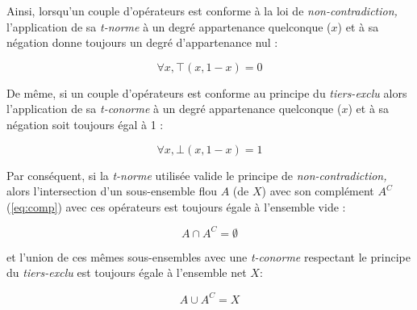 Ainsi, lorsqu'un couple d'opérateurs est conforme à la loi de
\emph{non-contradiction,} l’application de sa \emph{t-norme} à un
degré appartenance quelconque (\(x\)) et à sa négation donne toujours un
degré d'appartenance nul : 

\begin{equation}
  \forall x, ⊤(x,1-x) = 0
\end{equation}

De même, si un couple d'opérateurs est conforme au principe du
\emph{tiers-exclu} alors l’application de sa \emph{t-conorme} à un
degré appartenance quelconque (\(x\))  et à sa négation soit
toujours égal à 1 :

\begin{equation}
  \forall x, ⊥(x,1-x) = 1
\end{equation}

Par conséquent, si la \emph{t-norme} utilisée valide le principe de
\emph{non-contradiction,} alors l'intersection d'un sous-ensemble flou
\(A\) (de \(X\)) avec son complément \(A^C\) (\autoref{eq:comp}) avec
ces opérateurs est toujours égale à l'ensemble vide :

\begin{equation}
  A \cap A^C = \emptyset
\end{equation}

et l'union de ces mêmes sous-ensembles avec une \emph{t-conorme}
respectant le principe du \emph{tiers-exclu} est toujours égale à
l'ensemble net \(X\):

\begin{equation}
  A \cup A^C = X
\end{equation}

